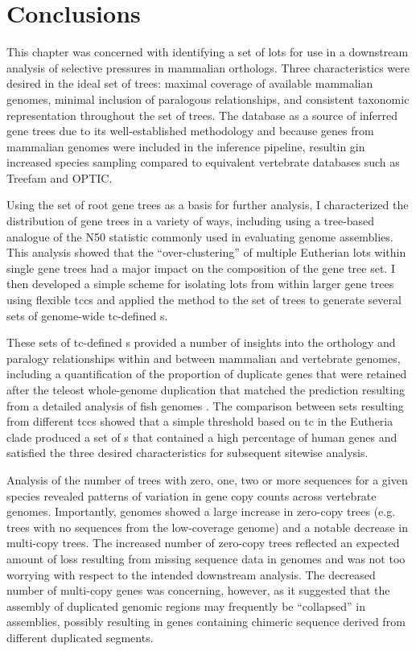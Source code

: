 \section{Conclusions}

This chapter was concerned with identifying a set of \acfp{lot} for use
in a downstream analysis of \sw selective pressures in mammalian
orthologs. Three characteristics were desired in the ideal set of
trees: maximal coverage of available mammalian genomes, minimal
inclusion of paralogous relationships, and consistent taxonomic
representation throughout the set of trees. The \ens \cmp database as
a source of inferred gene trees due to its well-established
methodology \citep{Heger2008,Vilella2009} and because genes from \lcv
mammalian genomes were included in the inference pipeline, resultin
gin increased species sampling compared to equivalent vertebrate
databases such as Treefam and OPTIC.

Using the set of root \cmp gene trees as a basis for further analysis,
I characterized the distribution of gene trees in a variety of ways,
including using a tree-based analogue of the N50 statistic commonly
used in evaluating genome assemblies. This analysis showed that the
``over-clustering'' of multiple Eutherian \acp{lot} within single \cmp
gene trees had a major impact on the composition of the gene tree
set. I then developed a simple scheme for isolating \acp{lot} from
within larger gene trees using flexible \acfp{tcc} and applied the
method to the set of \cmp trees to generate several sets of
genome-wide \ac{tc}-defined \subtr{}s.

These sets of \ac{tc}-defined \subtr{}s provided a number of insights
into the orthology and paralogy relationships within and between
mammalian and vertebrate genomes, including a quantification of the
proportion of duplicate genes that were retained after the teleost
whole-genome duplication that matched the prediction resulting from a
detailed analysis of fish genomes \citep{Brunet2006}. The comparison
between \subtr{} sets resulting from different \acp{tcc} showed that a
simple threshold based on \ac{tc} in the Eutheria clade produced a set
of \subtr{}s that contained a high percentage of human genes and
satisfied the three desired characteristics for subsequent sitewise
analysis.

Analysis of the number of trees with zero, one, two or more sequences
for a given species revealed patterns of variation in gene copy counts
across vertebrate genomes. Importantly, \lcv genomes showed a large
increase in zero-copy trees (e.g. trees with no sequences from the
low-coverage genome) and a notable decrease in multi-copy trees. The
increased number of zero-copy trees reflected an expected amount of
loss resulting from missing sequence data in \lcv genomes and was not
too worrying with respect to the intended downstream analysis. The
decreased number of multi-copy genes was concerning, however, as it
suggested that the assembly of duplicated genomic regions may
frequently be ``collapsed'' in \lcv assemblies, possibly resulting in
genes containing chimeric sequence derived from different duplicated
segments.

